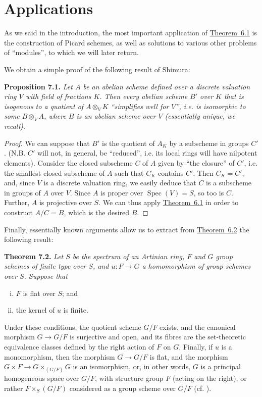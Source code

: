\documentclass{article}
\newenvironment{itenv}[1]
  {\phantomsection\par\medskip\noindent\textbf{#1.}\itshape}
  {\medskip}
\DeclareMathOperator{\Spec}{Spec}
\newcommand{\oldpage}[1]{\marginpar{\footnotesize$\Big\vert$ \textit{p.~#1}}}
\begin{document}
\section{Applications}
\label{7}

As we said in the introduction, the most important application of \hyperref[theorem6.1]{Theorem~6.1} is the construction of Picard schemes, as well as solutions to various other problems of ``modules'', to which we will later return.

We obtain a simple proof of the following result of Shimura:

\begin{itenv}{Proposition 7.1}
  Let $A$ be an abelian scheme defined over a discrete valuation ring $V$ with field of fractions $K$.
  Then every abelian scheme $B'$ over $K$ that is isogenous to a quotient of $A\otimes_V K$ ``simplifies well for $V$'', i.e. is isomorphic to some $B\otimes_V A$, where $B$ is an abelian scheme over $V$ (essentially unique, we recall).
\end{itenv}

\begin{proof}
  We can suppose that $B'$ is the quotient of $A_K$ by a subscheme in groups $C'$.
  (N.B. $C'$ will not, in general, be ``reduced'', i.e. its local rings will have nilpotent elements).
  Consider the closed subscheme $C$ of $A$ given by ``the closure'' of $C'$, i.e. the smallest closed subscheme of $A$ such that $C_K$ contains $C'$.
  Then $C_K=C'$, and, since $V$ is a discrete valuation ring, we easily deduce that $C$ is a subscheme in groups of $A$ over $V$.
  Since $A$ is proper over $\Spec(V)=S$, so too is $C$.
  Further, $A$ is projective over $S$.
  We can thus apply \hyperref[theorem6.1]{Theorem~6.1} in order to construct $A/C=B$,
\oldpage{212-17}
  which is the desired $B$.
\end{proof}

Finally, essentially known arguments allow us to extract from \hyperref[theorem6.2]{Theorem~6.2} the following result:

\begin{itenv}{Theorem 7.2}
  Let $S$ be the spectrum of an Artinian ring, $F$ and $G$ group schemes of finite type over $S$, and $u\colon F\to G$ a homomorphism of group schemes over $S$.
  Suppose that
  \begin{enumerate}[(i)]
    \item $F$ is flat over $S$; and
    \item the kernel of $u$ is finite.
  \end{enumerate}

  Under these conditions, the quotient scheme $G/F$ exists, and the canonical morphism $G\to G/F$ is surjective and open, and its fibres are the set-theoretic equivalence classes defined by the right action of $F$ on $G$.
  Finally, if $u$ is a monomorphism, then the morphism $G\to G/F$ is flat, and the morphism $G\times F\to G\times_{(G/F)}G$ is an isomorphism, or, in other words, $G$ is a principal homogeneous space over $G/F$, with structure group $F$ (acting on the right), or rather $F\times_S(G/F)$ considered as a group scheme over $G/F$ (cf. \cite[\S B.6]{1}).
\end{itenv}
\end{document}
